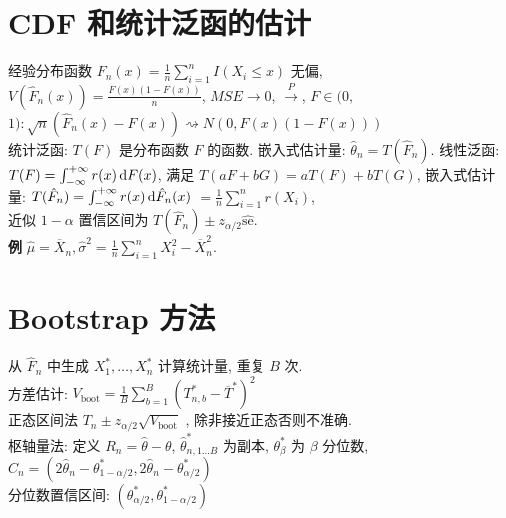 \documentclass[a4paper, landscape,10pt]{article}
\begin{document}
\newpage
\begin{multicols}{4}
\begin{scriptsize}
\section{CDF 和统计泛函的估计}
经验分布函数 $F_n(x) = \frac{1}{n} \sum_{i = 1}^n I(X_i \leq x)$
无偏,\\ $V(\hat F_n(x)) = \frac{F(x)(1 - F(x))}{n}$, $MSE \rightarrow 0$, $\xrightarrow{P}$,
$F \in (0,$ $1): \sqrt{n} (\hat F_n(x) - F(x)) \rightsquigarrow N(0, F(x)(1 - F(x)))$\\ 
统计泛函: $T(F)$ 是分布函数 $F$ 的函数. 嵌入式估计量: $\hat \theta_n = T(\hat F_n)$. 线性泛函: $T(F) = \int_{-\infty}^{+\infty} r(x) \,\mathrm{d} F(x)$, 满足 $T(aF + bG) = aT(F) + bT(G)$, 嵌入式估计量: $T(\hat F_n) = \int_{-\infty}^{+\infty} r(x) \,\mathrm{d} \hat F_n(x)$ $= \frac{1}{n} \sum_{i = 1}^n r(X_i)$,\\
近似 $1-\alpha$ 置信区间为 $T(\hat F_n) \pm z_{\alpha/2} \hat {\mathrm{se}}$.\\
{\bfseries 例} $\hat \mu = \overline X_n, \hat \sigma^2 = \frac{1}{n} \sum_{i = 1}^n X_i^2 - \overline X_n^2$. \\
\section{Bootstrap 方法}
从 $\hat F_n$ 中生成 $X_1^*, \dots, X_n^*$ 计算统计量, 重复 $B$ 次. \\
方差估计:  $V_{\mathrm{boot}} = \frac{1}{B} \sum_{b = 1}^B (T_{n,b}^* - \overline T^*)^2$\\
正态区间法 $T_n \pm z_{\alpha/2} \sqrt{V_{\mathrm{boot}}}$ , 除非接近正态否则不准确. \\
枢轴量法: 定义 $R_n = \hat \theta - \theta$, $\hat \theta_{n,1 \dots B }^*$ 为副本,
$\theta_\beta^*$ 为 $\beta$ 分位数, $C_n = (2 \hat \theta_n - \theta_{1 -\alpha / 2}^*, 2 \hat \theta_n - \theta_{\alpha / 2}^*)$\\
分位数置信区间: $(\theta_{\alpha/2}^*, \theta_{1 - \alpha/2}^*)$ \\

\end{scriptsize}
\end{multicols}
\end{document}
